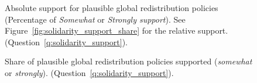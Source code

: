 \begin{figure}[h!]
    \caption[Absolute support for plausible global redistribution policies]{Absolute support for plausible global redistribution policies (Percentage of \textit{Somewhat} or \textit{Strongly support}). See Figure~\ref{fig:solidarity_support_share} for the relative support. (Question~\ref{q:solidarity_support}).
    }\label{fig:solidarity_support_positive}
\end{figure}

\begin{figure}[h!]
    \caption[Share of plausible global policies supported]{Share of plausible global redistribution policies supported (\textit{somewhat} or \textit{strongly}). (Question~\ref{q:solidarity_support}).
    }\label{fig:share_solidarity_supported}
\end{figure}

